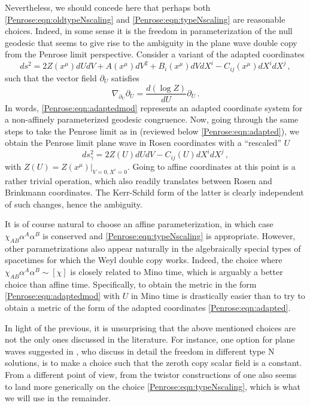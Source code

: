 Nevertheless, we should concede here that perhaps both \eqref{Penrose:eqn:oldtypeNscaling} and \eqref{Penrose:eqn:typeNscaling} are reasonable choices. Indeed, in some sense it is the freedom in parameterization of the null geodesic that seems to give rise to the ambiguity in the plane wave double copy from the Penrose limit perspective. Consider a variant of the adapted coordinates 
\begin{equation}\label{Penrose:eqn:adaptedmod}
ds^2 = 2 Z(x^{\mu}) dU dV + A(x^{\mu}) dV^2 + B_i(x^{\mu}) dV dX^i - C_{ij}(x^{\mu})dX^i dX^j \, ,
\end{equation}
such that the vector field $\partial_U$ satisfies
\begin{equation}
\nabla_{\partial_U}\partial_U = \frac{d\left(\log Z\right)}{dU} \partial_U \, .
\end{equation}
In words, \eqref{Penrose:eqn:adaptedmod} represents an adapted coordinate system for a non-affinely parameterized geodesic congruence. Now, going through the same steps to take the Penrose limit as in \cite{penrose1976any} (reviewed below \eqref{Penrose:eqn:adapted}), we obtain the Penrose limit plane wave in Rosen coordinates with a ``rescaled'' $U$
\begin{equation}\label{Penrose:eqn:Rosenmod}
ds_{\gamma}^2 = 2 Z(U)dU dV - C_{ij}(U)dX^i dX^j  \, ,
\end{equation}
with $Z(U) = Z(x^{\mu})|_{V=0,X^i=0}$. Going to affine coordinates at this point is a rather trivial operation, which also readily translates between Rosen and Brinkmann coordinates. The Kerr-Schild form of the latter is clearly independent of such changes, hence the ambiguity. 

It is of course natural to choose an affine parameterization, in which case $\chi_{AB} \alpha^A \alpha^B$ is conserved and \eqref{Penrose:eqn:typeNscaling} is appropriate. However, other parametrizations also appear naturally in the algebraically special types of spacetimes for which the Weyl double copy works. Indeed, the choice where $\chi_{AB} \alpha^A \alpha^B \sim [\chi]$ is closely related to Mino time, which is arguably a better choice than affine time. Specifically, to obtain the metric in the form \eqref{Penrose:eqn:adaptedmod} with $U$ in Mino time is drastically easier than to try to obtain a metric of the form of the adapted coordinates \eqref{Penrose:eqn:adapted}.

In light of the previous, it is unsurprising that the above mentioned choices are not the only ones discussed in
the literature. For instance, one option for plane waves suggested in \cite{Godazgar:2020zbv}, who discuss in
detail the freedom in different type N solutions, is to make a choice such that the zeroth copy scalar field is a
constant. From a different point of view, from the twistor constructions of \cite{White:2020sfn, Chacon:2021wbr}
one also seems to land more generically on the choice \eqref{Penrose:eqn:typeNscaling}, which is what we will use in the remainder. 

